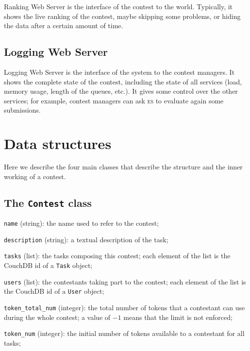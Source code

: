 \documentclass[a4paper,8pt]{amsart}
\newcommand{\ES}{\textsc{es}}
\newenvironment{squishlist}{%
  \begin{list}{\textbullet}%
    { \setlength{\itemsep}{0pt}%
      \setlength{\parsep}{3pt}%
      \setlength{\topsep}{3pt}%
      \setlength{\partopsep}{0pt}%
      \setlength{\leftmargin}{1.5em}%
      \setlength{\labelwidth}{1em}%
      \setlength{\labelsep}{0.5em} }%
}{\end{list}}
\newcommand{\id}[1]{\texttt{#1}}
\begin{document}
\begin{multicols}{2}
  Ranking Web Server is the interface of the contest to the
  world. Typically, it shows the live ranking of the contest, maybe
  skipping some problems, or hiding the data after a certain amount of
  time.

  \subsection{Logging Web Server}

  Logging Web Server is the interface of the system to the contest
  managers. It shows the complete state of the contest, including the
  state of all services (load, memory usage, length of the queues,
  etc.). It gives some control over the other services; for example,
  contest managers can ask \ES{} to evaluate again some submissions.

  \section{Data structures}

  Here we describe the four main classes that describe the structure
  and the inner working of a contest.

  \subsection{The \id{Contest} class}

  \begin{squishlist}

  \item \id{name} (string): the name used to refer to the contest;

  \item \id{description} (string): a textual description of the
    task;

  \item \id{tasks} (list): the tasks composing this contest; each
    element of the list is the CouchDB id of a \id{Task} object;

  \item \id{users} (list): the contestants taking part to the
    contest; each element of the list is the CouchDB id of a
    \id{User} object;

  \item \id{token\_total\_num} (integer): the total number of tokens
    that a contestant can use during the whole contest; a value of
    $-1$ means that the limit is not enforced;

  \item \id{token\_num} (integer): the initial number of tokens
    available to a contestant for all tasks;


\end{squishlist}
\end{multicols}
\end{document}

